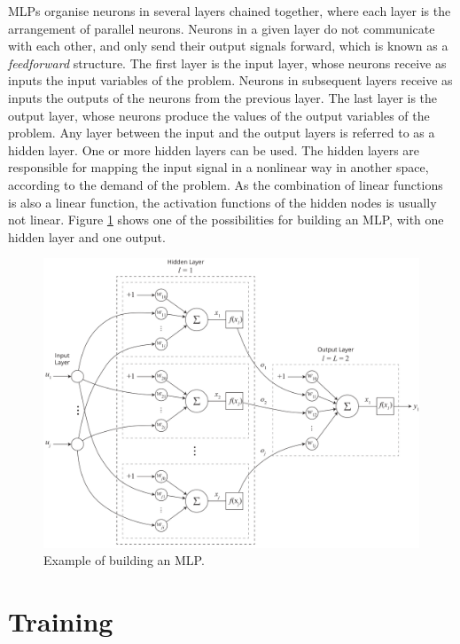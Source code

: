 MLPs organise neurons in several layers chained together, where each layer is the arrangement of parallel neurons. Neurons in a given layer do not communicate with each other, and only send their output signals forward, which is known as a \textit{feedforward} structure. The first layer is the input layer, whose neurons receive as inputs the input variables of the problem. Neurons in subsequent layers receive as inputs the outputs of the neurons from the previous layer. The last layer is the output layer, whose neurons produce the values of the output variables of the problem. Any layer between the input and the output layers is referred to as a hidden layer. One or more hidden layers can be used.  The hidden layers are responsible for mapping the input signal in a nonlinear way in another space, according to the demand of the problem. As the combination of linear functions is also a linear function, the activation functions of the hidden nodes is usually not linear.
Figure \ref{fig:mlp} shows one of the possibilities for building an MLP, with one hidden layer and one output.

\begin{figure}[h!]
    \centering
    \includegraphics[width=1\textwidth]{"Part 3 - Learning Systems/Supervised Learning/Multilayer Perceptron/MLP.png"}
    \caption{Example of building an MLP.}
    \label{fig:mlp}
\end{figure}

\section{Training}
\label{ssec:treino}

